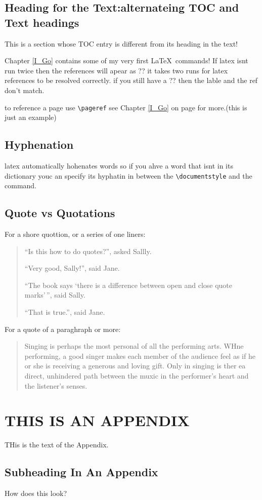 \section[HEading for the TOC]{Heading for the Text:alternateing TOC and Text headings}
This is a section whose TOC entry is different from its heading in the text!

Chapter \ref{I_Go} contains some of my very first \LaTeX\ commands!
If latex isnt run twice then the references will apear as ?? it takes two runs for latex references to be resolved correctly. if you still have a ?? then the lable and the ref don't match.

to reference a  page use \verb!\pageref!  see Chapter \ref{I_Go} on page \pageref{I_Go} for more.(this is just an example)
\section{Hyphenation}
latex automatically hohenates words so if you ahve a word that isnt in its dictionary youc an specify its hyphatin in between the \verb!\documentstyle! and the
\verb!! command.

\section{Quote vs Quotations}
For a shore quottion, or a series of one liners:

\begin{quote}
``Is this how to do quotes?'', asked Sallly.

``Very good, Sally!'', said Jane.

``The book says `there is a difference between open and close quote marks'\,'', said Sally.

``That is true.'', said Jane.
\end{quote}

For a quote of a paraghraph or more:

\begin{quotation}
Singing is perhaps the most personal of all the performing arts. WHne performing, a good singer makes each member of the audience feel as if he or she is receiving a generous and loving gift. Only in singing is ther ea direct, unhindered path between the muxic in the performer's heart and the listener's senses.
\end{quotation}

\appendix
\chapter{THIS IS AN APPENDIX}
THis is the text of the Appendix.
\section {Subheading In An Appendix}
How does this look?

